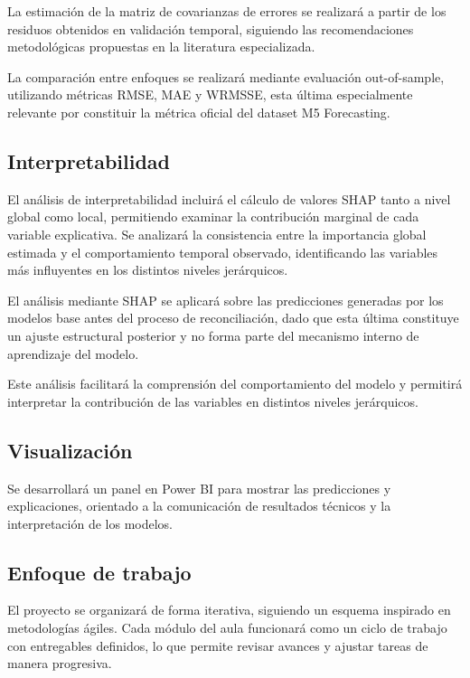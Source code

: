 \documentclass[IB,BIB]{TFUOC}%
\begin{document}
La estimación de la matriz de covarianzas de errores se realizará a
partir de los residuos obtenidos en validación temporal, siguiendo las
recomendaciones metodológicas propuestas en la literatura especializada.

La comparación entre enfoques se realizará mediante evaluación
out-of-sample, utilizando métricas RMSE, MAE y WRMSSE, esta última
especialmente relevante por constituir la métrica oficial del dataset M5
Forecasting.

\subsection{Interpretabilidad}

El análisis de interpretabilidad incluirá el cálculo de valores SHAP
tanto a nivel global como local, permitiendo examinar la contribución
marginal de cada variable explicativa. Se analizará la consistencia
entre la importancia global estimada y el comportamiento temporal
observado, identificando las variables más influyentes en los distintos
niveles jerárquicos.

El análisis mediante SHAP se aplicará sobre las predicciones generadas
por los modelos base antes del proceso de reconciliación, dado que esta
última constituye un ajuste estructural posterior y no forma parte del
mecanismo interno de aprendizaje del modelo.

Este análisis facilitará la comprensión del comportamiento del modelo y
permitirá interpretar la contribución de las variables en distintos
niveles jerárquicos.

\subsection{Visualización}

Se desarrollará un panel en Power BI para mostrar las predicciones y
explicaciones, orientado a la comunicación de resultados técnicos y la
interpretación de los modelos.

\subsection{Enfoque de trabajo}

El proyecto se organizará de forma iterativa, siguiendo un esquema
inspirado en metodologías ágiles. Cada módulo del aula funcionará como
un ciclo de trabajo con entregables definidos, lo que permite revisar
avances y ajustar tareas de manera progresiva.
\end{document}

